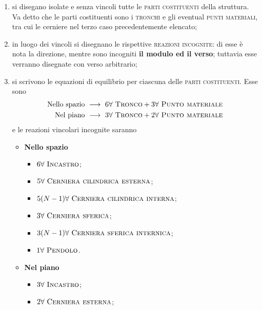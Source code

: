 \begin{enumerate}
\item si disegano isolate e senza vincoli tutte le \textsc{parti costituenti} della struttura. Va detto che le parti costituenti sono i \textsc{tronchi} e gli eventual \textsc{punti materiali}, tra cui le cerniere nel terzo caso precedentemente elencato;
\item in luogo dei vincoli si disegnano le rispettive \textsc{reazioni incognite}: di esse è nota la direzione, mentre sono incogniti \textbf{il modulo ed il verso}; tuttavia esse verranno disegnate con verso arbitrario; 
\item si scrivono le equazioni di equilibrio per ciascuna delle \textsc{parti costituenti}. Esse sono 
\begin{align*}
\textup{Nello spazio}\,\,&\longrightarrow\,\,6 \forall\,\,\textup{\textsc{Tronco}} + 3 \forall\,\,\textup{\textsc{Punto materiale}} \\
\textup{Nel piano}\,\,&\longrightarrow\,\,3 \forall\,\,\textup{\textsc{Tronco}} + 2 \forall\,\,\textup{\textsc{Punto materiale}}
\end{align*}
e le reazioni vincolari incognite saranno 
\begin{itemize}
\item \textbf{Nello spazio} 
\begin{itemize}
\item $6\forall\,\,\textup{\textsc{Incastro}}$;
\item $5\forall\,\,\textup{\textsc{Cerniera cilindrica esterna}}$;
\item $5(N-1)\forall\,\,\textup{\textsc{Cerniera cilindrica interna}}$;
\item $3\forall\,\,\textup{\textsc{Cerniera sferica}}$;
\item $3(N-1)\forall\,\,\textup{\textsc{Cerniera sferica internica}}$;
\item $1\forall\,\,\textup{\textsc{Pendolo}}$.
\end{itemize}
\item \textbf{Nel piano}  
\begin{itemize}
\item $3\forall\,\,\textup{\textsc{Incastro}}$;
\item $2\forall\,\,\textup{\textsc{Cerniera esterna}}$;

\end{itemize}
\end{itemize}
\end{enumerate}
